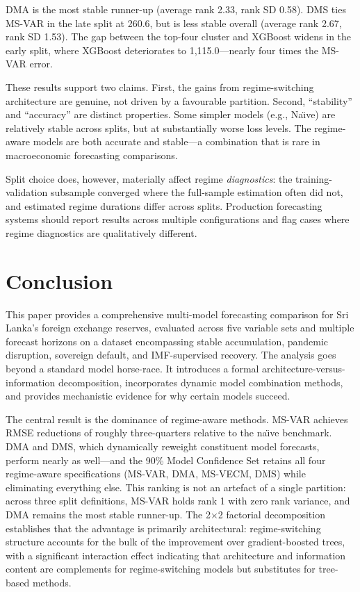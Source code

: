 \documentclass[12pt,a4paper]{article}
\begin{document}
DMA is the most stable runner-up (average rank 2.33, rank SD 0.58). DMS ties MS-VAR in the late split at 260.6, but is less stable overall (average rank 2.67, rank SD 1.53). The gap between the top-four cluster and XGBoost widens in the early split, where XGBoost deteriorates to 1,115.0---nearly four times the MS-VAR error.

These results support two claims. First, the gains from regime-switching architecture are genuine, not driven by a favourable partition. Second, ``stability'' and ``accuracy'' are distinct properties. Some simpler models (e.g., Na\"{\i}ve) are relatively stable across splits, but at substantially worse loss levels. The regime-aware models are both accurate and stable---a combination that is rare in macroeconomic forecasting comparisons.

Split choice does, however, materially affect regime \textit{diagnostics}: the training-validation subsample converged where the full-sample estimation often did not, and estimated regime durations differ across splits. Production forecasting systems should report results across multiple configurations and flag cases where regime diagnostics are qualitatively different.

\section{Conclusion}

This paper provides a comprehensive multi-model forecasting comparison for Sri Lanka's foreign exchange reserves, evaluated across five variable sets and multiple forecast horizons on a dataset encompassing stable accumulation, pandemic disruption, sovereign default, and IMF-supervised recovery. The analysis goes beyond a standard model horse-race. It introduces a formal architecture-versus-information decomposition, incorporates dynamic model combination methods, and provides mechanistic evidence for why certain models succeed.

The central result is the dominance of regime-aware methods. MS-VAR achieves RMSE reductions of roughly three-quarters relative to the na\"{\i}ve benchmark. DMA and DMS, which dynamically reweight constituent model forecasts, perform nearly as well---and the 90\% Model Confidence Set retains all four regime-aware specifications (MS-VAR, DMA, MS-VECM, DMS) while eliminating everything else. This ranking is not an artefact of a single partition: across three split definitions, MS-VAR holds rank 1 with zero rank variance, and DMA remains the most stable runner-up. The 2$\times$2 factorial decomposition establishes that the advantage is primarily architectural: regime-switching structure accounts for the bulk of the improvement over gradient-boosted trees, with a significant interaction effect indicating that architecture and information content are complements for regime-switching models but substitutes for tree-based methods.
\end{document}
